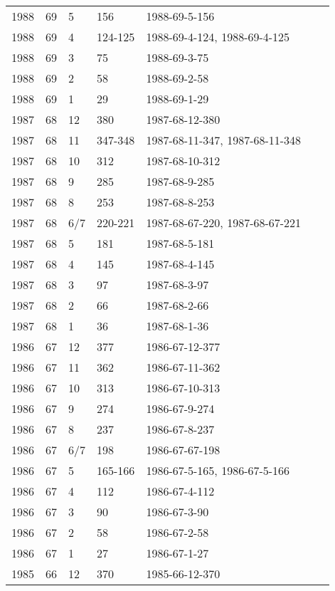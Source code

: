 \begin{longtable}{ |l|l|l|l|p{2.7cm}|l|p{2cm}| }
 1988 & 69 &     5 &    156  & 1988-69-5-156  &  & \\
 1988 & 69 &     4 & 124-125 & 1988-69-4-124, 1988-69-4-125 &  & \\
 1988 & 69 &     3 &     75  & 1988-69-3-75   &  & \\
 1988 & 69 &     2 &     58  & 1988-69-2-58   &  & \\
 1988 & 69 &     1 &     29  & 1988-69-1-29   &  & \\
 1987 & 68 &    12 &    380  & 1987-68-12-380 &  & \\
 1987 & 68 &    11 & 347-348 & 1987-68-11-347, 1987-68-11-348 &  & \\
 1987 & 68 &    10 &   312   & 1987-68-10-312 &  & \\
 1987 & 68 &     9 &    285  & 1987-68-9-285  &  & \\
 1987 & 68 &     8 &    253  & 1987-68-8-253  &  & \\
 1987 & 68 &   6/7 & 220-221 & 1987-68-67-220, 1987-68-67-221 &  & \\
 1987 & 68 &     5 &   181   & 1987-68-5-181  &  & \\
 1987 & 68 &     4 &    145  & 1987-68-4-145  &  & \\
 1987 & 68 &     3 &    97   & 1987-68-3-97   &  & \\
 1987 & 68 &     2 &    66   & 1987-68-2-66   &  & \\
 1987 & 68 &     1 &   36    & 1987-68-1-36   &  & \\
 1986 & 67 &    12 &    377  & 1986-67-12-377 &  & \\
 1986 & 67 &    11 &    362  & 1986-67-11-362 &  & \\
 1986 & 67 &    10 &    313  & 1986-67-10-313 &  & \\
 1986 & 67 &     9 &    274  & 1986-67-9-274  &  & \\
 1986 & 67 &     8 &    237  & 1986-67-8-237  &  & \\
 1986 & 67 &   6/7 &    198  & 1986-67-67-198 &  & \\
 1986 & 67 &     5 & 165-166 & 1986-67-5-165, 1986-67-5-166  &  & \\
 1986 & 67 &     4 &    112  & 1986-67-4-112  &  & \\
 1986 & 67 &     3 &     90  & 1986-67-3-90   &  & \\
 1986 & 67 &     2 &     58  & 1986-67-2-58   &  & \\
 1986 & 67 &     1 &     27  & 1986-67-1-27   &  & \\
 1985 & 66 &    12 &    370  & 1985-66-12-370 &  & \\

\end{longtable}

